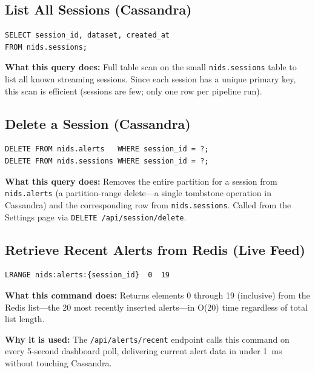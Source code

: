 \documentclass[12pt,a4paper]{report}
\begin{document}
\subsection{List All Sessions (Cassandra)}
\begin{lstlisting}[style=cqlstyle,
  caption={CQL: Retrieve all sessions for the Settings page},
  label={lst:select-sessions}]
SELECT session_id, dataset, created_at
FROM nids.sessions;
\end{lstlisting}

\textbf{What this query does:}  Full table scan on the small
\texttt{nids.sessions} table to list all known streaming sessions.  Since
each session has a unique primary key, this scan is efficient
(sessions are few; only one row per pipeline run).

\subsection{Delete a Session (Cassandra)}
\begin{lstlisting}[style=cqlstyle,
  caption={CQL: Delete all alert data and metadata for a session},
  label={lst:delete}]
DELETE FROM nids.alerts   WHERE session_id = ?;
DELETE FROM nids.sessions WHERE session_id = ?;
\end{lstlisting}

\textbf{What this query does:}  Removes the entire partition for a session
from \texttt{nids.alerts} (a partition-range delete---a single tombstone
operation in Cassandra) and the corresponding row from \texttt{nids.sessions}.
Called from the Settings page via \texttt{DELETE /api/session/delete}.

\subsection{Retrieve Recent Alerts from Redis (Live Feed)}
\begin{lstlisting}[style=bashstyle,
  caption={Redis: Return the 20 most recent alerts (live feed)},
  label={lst:lrange}]
LRANGE nids:alerts:{session_id}  0  19
\end{lstlisting}

\textbf{What this command does:}  Returns elements 0 through 19 (inclusive)
from the Redis list---the 20 most recently inserted alerts---in O(20) time
regardless of total list length.

\textbf{Why it is used:}  The \texttt{/api/alerts/recent} endpoint calls this
command on every 5-second dashboard poll, delivering current alert data in
under 1~ms without touching Cassandra.
\end{document}
